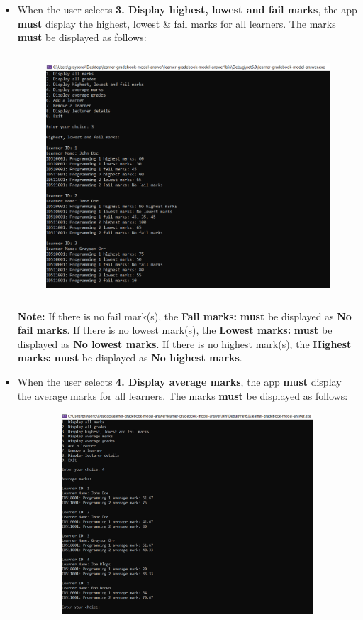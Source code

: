 \documentclass{article}
\begin{document}
\begin{itemize}
\begin{figure}[ht]
    \end{figure}
    \item When the user selects \textbf{3. Display highest, lowest and fail marks}, the app \textbf{must} display the highest, lowest \& fail marks for all learners. The marks \textbf{must} be displayed as follows:
    \begin{figure}[ht]
        \centering
        \includegraphics[width=150mm,height=90mm]{../../resources/img/project-1/4.PNG}
    \end{figure}
    \newpage
    \textbf{Note:} If there is no fail mark(s), the \textbf{Fail marks:} \textbf{must} be displayed as \textbf{No fail marks}. If there is no lowest mark(s), the \textbf{Lowest marks:} \textbf{must} be displayed as \textbf{No lowest marks}. If there is no highest mark(s), the \textbf{Highest marks:} \textbf{must} be displayed as \textbf{No highest marks}.
    \item When the user selects \textbf{4. Display average marks}, the app \textbf{must} display the average marks for all learners. The marks \textbf{must} be displayed as follows:
    \begin{figure}[ht]
        \centering
        \includegraphics[width=150mm,height=75mm]{../../resources/img/project-1/5.PNG}

\end{figure}
\end{itemize}
\end{document}
